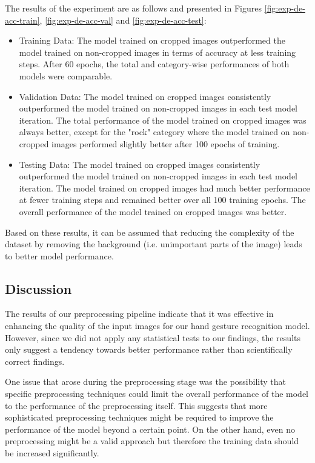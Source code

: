 \documentclass[a4paper]{article}
\begin{document}
The results of the experiment are as follows and presented in Figures \ref{fig:exp-de-acc-train}, \ref{fig:exp-de-acc-val} and \ref{fig:exp-de-acc-test}:
\begin{itemize}
	\item Training Data: The model trained on cropped images outperformed the model trained on non-cropped images in terms of accuracy at less training steps. After 60 epochs, the total and category-wise performances of both models were comparable.

    \item Validation Data: The model trained on cropped images consistently outperformed the model trained on non-cropped images in each test model iteration. The total performance of the model trained on cropped images was always better, except for the "rock" category where the model trained on non-cropped images performed slightly better after 100 epochs of training.

    \item Testing Data: The model trained on cropped images consistently outperformed the model trained on non-cropped images in each test model iteration. The model trained on cropped images had much better performance at fewer training steps and remained better over all 100 training epochs. The overall performance of the model trained on cropped images was better.

\end{itemize}
Based on these results, it can be assumed that reducing the complexity of the dataset by removing the background (i.e. unimportant parts of the image) leads to better model performance.

\subsection{Discussion}

The results of our preprocessing pipeline indicate that it was effective in enhancing the quality of the input images for our hand gesture recognition model. However, since we did not apply any statistical tests to our findings, the results only suggest a tendency towards better performance rather than scientifically correct findings.

One issue that arose during the preprocessing stage was the possibility that specific preprocessing techniques could limit the overall performance of the model to the performance of the preprocessing itself. This suggests that more sophisticated preprocessing techniques might be required to improve the performance of the model beyond a certain point. On the other hand, even no preprocessing might be a valid approach but therefore the training data should be increased significantly.
\end{document}
